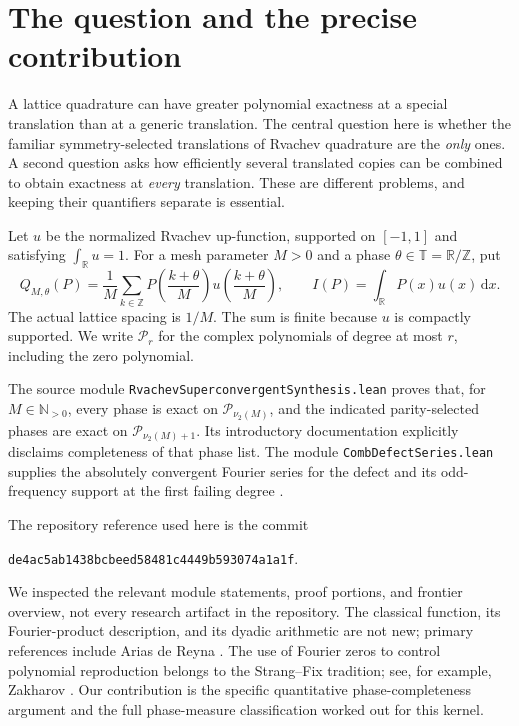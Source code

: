 \documentclass[11pt,a4paper]{article}
\numberwithin{equation}{section}
\theoremstyle{plain}
\theoremstyle{definition}
\theoremstyle{remark}
\newcommand{\R}{\mathbb R}
\newcommand{\Z}{\mathbb Z}
\newcommand{\N}{\mathbb N}
\newcommand{\T}{\mathbb T}
\newcommand{\dd}{\,\mathrm d}
\newcommand{\Poly}{\mathcal P}
\newcommand{\code}[1]{\texttt{\small #1}}
\begin{document}
\hypersetup{pageanchor=true}

\begingroup
\small
\setlength{\parskip}{0pt}
\tableofcontents
\endgroup
\newpage

\section{The question and the precise contribution}
\label{sec:introduction}

A lattice quadrature can have greater polynomial exactness at a special
translation than at a generic translation. The central question here is
whether the familiar symmetry-selected translations of Rvachev quadrature
are the \emph{only} ones. A second question asks how efficiently several
translated copies can be combined to obtain exactness at \emph{every}
translation. These are different problems, and keeping their quantifiers
separate is essential.

Let $u$ be the normalized Rvachev up-function, supported on $[-1,1]$ and
satisfying $\int_\R u=1$. For a mesh parameter $M>0$ and a phase
$\theta\in\T=\R/\Z$, put
\begin{equation}\label{eq:quadrature}
 Q_{M,\theta}(P)=\frac1M\sum_{k\in\Z}
 P\!\left(\frac{k+\theta}{M}\right)
 u\!\left(\frac{k+\theta}{M}\right),
 \qquad I(P)=\int_\R P(x)u(x)\dd x.
\end{equation}
The actual lattice spacing is $1/M$. The sum is finite because $u$ is
compactly supported. We write $\Poly_r$ for the complex polynomials of
degree at most $r$, including the zero polynomial.

The source module \code{RvachevSuperconvergentSynthesis.lean}
proves that, for $M\in\N_{>0}$, every phase is exact on
$\Poly_{\nu_2(M)}$, and the indicated parity-selected phases are exact on
$\Poly_{\nu_2(M)+1}$. Its introductory documentation explicitly disclaims
completeness of that phase list. The module
\code{CombDefectSeries.lean} supplies the absolutely convergent Fourier
series for the defect and its odd-frequency support at the first failing
degree \cite{repo-phase,repo-defect}.

The repository reference used here is the commit
\begin{center}
\small\texttt{de4ac5ab1438bcbeed58481c4449b593074a1a1f}.
\end{center}
We inspected the relevant module statements, proof portions, and frontier
overview, not every research artifact in the repository. The classical
function, its Fourier-product description, and its dyadic arithmetic are
not new; primary references include Arias de Reyna
\cite{arias1982,arias2017}. The use of Fourier zeros to control polynomial
reproduction belongs to the Strang--Fix tradition; see, for example,
Zakharov \cite{zakharov2013}. Our contribution is the specific quantitative
phase-completeness argument and the full phase-measure classification
worked out for this kernel.
\end{document}
